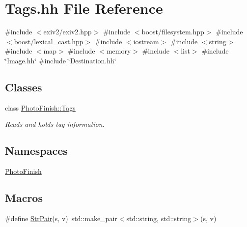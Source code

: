 \hypertarget{_tags_8hh}{}\section{Tags.\+hh File Reference}
\label{_tags_8hh}
{\ttfamily \#include $<$exiv2/exiv2.\+hpp$>$}\newline
{\ttfamily \#include $<$boost/filesystem.\+hpp$>$}\newline
{\ttfamily \#include $<$boost/lexical\+\_\+cast.\+hpp$>$}\newline
{\ttfamily \#include $<$iostream$>$}\newline
{\ttfamily \#include $<$string$>$}\newline
{\ttfamily \#include $<$map$>$}\newline
{\ttfamily \#include $<$memory$>$}\newline
{\ttfamily \#include $<$list$>$}\newline
{\ttfamily \#include \char`\"{}Image.\+hh\char`\"{}}\newline
{\ttfamily \#include \char`\"{}Destination.\+hh\char`\"{}}\newline
\subsection*{Classes}
\begin{DoxyCompactItemize}
\item 
class \hyperlink{class_photo_finish_1_1_tags}{Photo\+Finish\+::\+Tags}
\begin{DoxyCompactList}\small\item\em Reads and holds tag information. \end{DoxyCompactList}\end{DoxyCompactItemize}
\subsection*{Namespaces}
\begin{DoxyCompactItemize}
\item 
 \hyperlink{namespace_photo_finish}{Photo\+Finish}
\end{DoxyCompactItemize}
\subsection*{Macros}
\begin{DoxyCompactItemize}
\item 
\#define \hyperlink{_tags_8hh_a19c06ce5d6cdc9b5a13fd3eae3dfa411}{Str\+Pair}(s,  v)~std\+::make\+\_\+pair$<$std\+::string, std\+::string$>$(s, v)
\end{DoxyCompactItemize}
